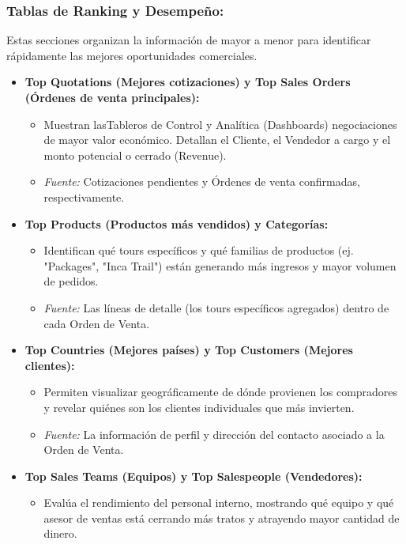 \subsubsection*{Tablas de Ranking y Desempeño:}
Estas secciones organizan la información de mayor a menor para identificar rápidamente las mejores oportunidades comerciales.

\begin{itemize}[leftmargin=*]
    \item \textbf{Top Quotations (Mejores cotizaciones) y Top Sales Orders (Órdenes de venta principales):}
    \begin{itemize}
        \item Muestran lasTableros de Control y Analítica (Dashboards) negociaciones de mayor valor económico. Detallan el Cliente, el Vendedor a cargo y el monto potencial o cerrado (Revenue).
        \item \textit{Fuente:} Cotizaciones pendientes y Órdenes de venta confirmadas, respectivamente.
    \end{itemize}
    \item \textbf{Top Products (Productos más vendidos) y Categorías:}
    \begin{itemize}
        \item Identifican qué tours específicos y qué familias de productos (ej. "Packages", "Inca Trail") están generando más ingresos y mayor volumen de pedidos.
        \item \textit{Fuente:} Las líneas de detalle (los tours específicos agregados) dentro de cada Orden de Venta.
    \end{itemize}
    \item \textbf{Top Countries (Mejores países) y Top Customers (Mejores clientes):}
    \begin{itemize}
        \item Permiten visualizar geográficamente de dónde provienen los compradores y revelar quiénes son los clientes individuales que más invierten.
        \item \textit{Fuente:} La información de perfil y dirección del contacto asociado a la Orden de Venta.
    \end{itemize}
    \item \textbf{Top Sales Teams (Equipos) y Top Salespeople (Vendedores):}
    \begin{itemize}
        \item Evalúa el rendimiento del personal interno, mostrando qué equipo y qué asesor de ventas está cerrando más tratos y atrayendo mayor cantidad de dinero.

\end{itemize}
\end{itemize}
